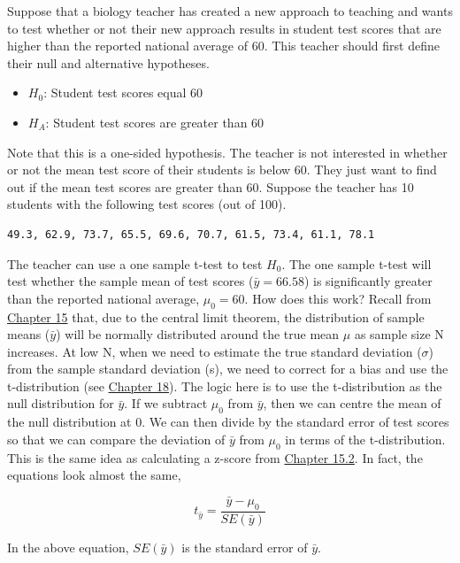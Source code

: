 \documentclass[
]{scrbook}
\providecommand{\tightlist}{%
  \setlength{\itemsep}{0pt}\setlength{\parskip}{0pt}}
\begin{document}
Suppose that a biology teacher has created a new approach to teaching and wants to test whether or not their new approach results in student test scores that are higher than the reported national average of 60.
This teacher should first define their null and alternative hypotheses.

\begin{itemize}
\tightlist
\item
  \(H_{0}\): Student test scores equal 60
\item
  \(H_{A}\): Student test scores are greater than 60
\end{itemize}

Note that this is a one-sided hypothesis.
The teacher is not interested in whether or not the mean test score of their students is below 60.
They just want to find out if the mean test scores are greater than 60.
Suppose the teacher has 10 students with the following test scores (out of 100).

\begin{verbatim}
49.3, 62.9, 73.7, 65.5, 69.6, 70.7, 61.5, 73.4, 61.1, 78.1
\end{verbatim}

The teacher can use a one sample t-test to test \(H_{0}\).
The one sample t-test will test whether the sample mean of test scores (\(\bar{y} = 66.58\)) is significantly greater than the reported national average, \(\mu_{0} = 60\).
How does this work?
Recall from \protect\hyperlink{Chapter_15}{Chapter 15} that, due to the central limit theorem, the distribution of sample means (\(\bar{y}\)) will be normally distributed around the true mean \(\mu\) as sample size N increases.
At low N, when we need to estimate the true standard deviation (\(\sigma\)) from the sample standard deviation (s), we need to correct for a bias and use the t-distribution (see \protect\hyperlink{Chapter_18}{Chapter 18}).
The logic here is to use the t-distribution as the null distribution for \(\bar{y}\).
If we subtract \(\mu_{0}\) from \(\bar{y}\), then we can centre the mean of the null distribution at 0.
We can then divide by the standard error of test scores so that we can compare the deviation of \(\bar{y}\) from \(\mu_{0}\) in terms of the t-distribution.
This is the same idea as calculating a z-score from \protect\hyperlink{probability-and-z-scores}{Chapter 15.2}.
In fact, the equations look almost the same,

\[t_{\bar{y}} = \frac{\bar{y} - \mu_{0}}{SE(\bar{y})}\]

In the above equation, \(SE(\bar{y})\) is the standard error of \(\bar{y}\).
\end{document}
